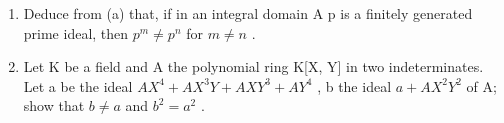 \begin{enumerate}
\def\labelenumi{(\alph{enumi})}
\setcounter{enumi}{1}
\item
  Deduce from (a) that, if in an integral domain A p is a finitely generated prime ideal, then \(p^{m} \neq p^{n}\) for \(m \neq n\) .
\item
  Let K be a field and A the polynomial ring K{[}X, Y{]} in two indeterminates. Let a be the ideal \(AX^{4} + AX^{3}Y + AXY^{3} + AY^{4}\) , b the ideal \(a + AX^{2}Y^{2}\) of A; show that \(b \neq a\) and \(b^{2} = a^{2}\) .
\end{enumerate}
